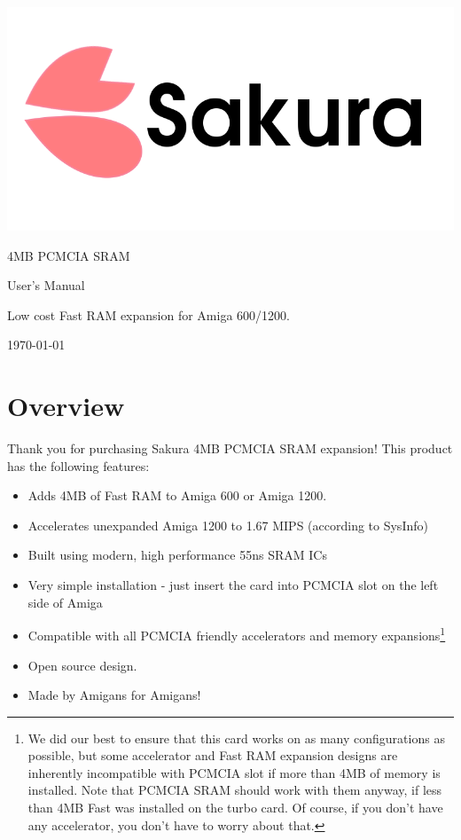 \documentclass[10pt,a5paper]{article}
\begin{document}
\begin{titlepage}
\begin{center}

\includegraphics[scale=0.25]{sakuralogo.png}
\vfill

\huge
4MB PCMCIA SRAM

User's Manual

\vspace*{1cm}

\normalsize
Low cost Fast RAM expansion for Amiga 600/1200.

\vspace*{5cm}

\today

\end{center}
\end{titlepage}

\section*{Overview}

Thank you for purchasing Sakura 4MB PCMCIA SRAM expansion! This product has the following features:

\begin{itemize}
	\item Adds 4MB of Fast RAM to Amiga 600 or Amiga 1200.
	\item Accelerates unexpanded Amiga 1200 to 1.67 MIPS (according to SysInfo)
	\item Built using modern, high performance 55ns SRAM ICs 
	\item Very simple installation - just insert the card into PCMCIA slot on the left side of Amiga
	\item Compatible with all PCMCIA friendly accelerators and memory expansions\footnote{We did our best to ensure that this card works on as many configurations as possible, but some accelerator and Fast RAM expansion designs are inherently incompatible with PCMCIA slot if more than 4MB of memory is installed. Note that PCMCIA SRAM should work with them anyway, if less than 4MB Fast was installed on the turbo card. Of course, if you don’t have any accelerator, you don’t have to worry about that.}
	\item Open source design.
	\item Made by Amigans for Amigans! 
\end{itemize}
\end{document}

